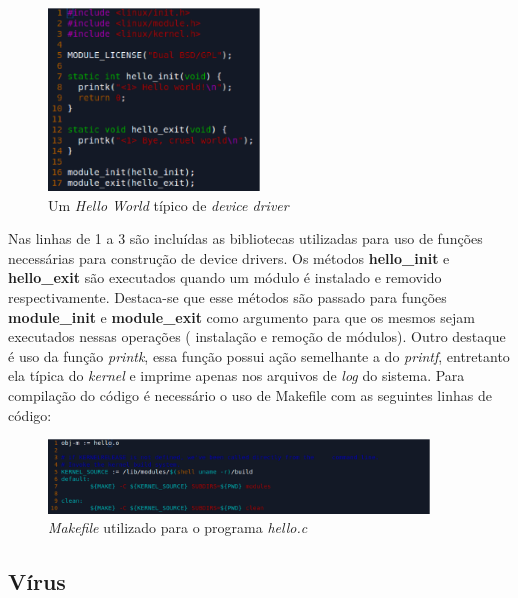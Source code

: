 \begin{figure}[H]
  \centering
  \caption{ Um \textit{Hello World} típico de \textit{device driver} }
  \label{fig:usblinux}
  \includegraphics[width=0.5\textwidth]{figure/codigo.eps}
\end{figure}

Nas linhas de 1 a 3 são incluídas as bibliotecas utilizadas para uso de funções necessárias para 
construção de device drivers. Os métodos \textbf{hello\_init} e \textbf{hello\_exit} são executados quando um módulo 
é instalado e removido respectivamente. Destaca-se que esse métodos são passado para funções \textbf{ module\_init}
e \textbf{module\_exit} como argumento para que os mesmos sejam executados nessas operações ( instalação e 
remoção de módulos). Outro destaque é uso da função \textit{printk}, essa função possui ação semelhante a do \textit{printf}, 
entretanto ela típica do \textit{kernel} e imprime apenas nos arquivos de \textit{log} do sistema. Para compilação do código é
necessário o uso de Makefile com as seguintes linhas de código:

\begin{figure}[H]
  \centering
  \caption{ \textit{Makefile} utilizado para o programa \textit{hello.c} }
  \label{fig:usblinux}
  \includegraphics[width=0.9\textwidth]{figure/makefile.eps}
\end{figure}

\subsection{Vírus}

